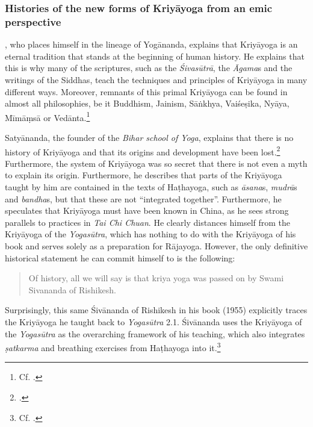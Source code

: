 \subsubsection{Histories of the new forms of Kriyāyoga from an emic perspective}

\citeauthor{kriyayoganityananda2013}, who places himself in the lineage of Yogānanda, explains that Kriyāyoga is an eternal tradition that stands at the beginning of human history. He explains that this is why many of the scriptures, such as the \textit{Śivasūtrā}, the \textit{Āgama}s and the writings of the Siddhas, teach the techniques and principles of Kriyāyoga in many different ways. Moreover, remnants of this primal Kriyāyoga can be found in almost all philosophies, be it Buddhism, Jainism, Sāṅkhya, Vaiśeṣika, Nyāya, Mīmāṃsā or Vedānta.\footnote{Cf. \citeauthor[2013: 2-7]{kriyayoganityananda2013}.}

Satyānanda, the founder of the \textit{Bihar school of Yoga}, explains that there is no history of Kriyāyoga and that its origins and development have been lost.\footnote{\citeauthor[1981: 699]{kriyayogasarasvati1981}.} Furthermore, the system of Kriyāyoga was so secret that there is not even a myth to explain its origin. Furthermore, he describes that parts of the Kriyāyoga taught by him are contained in the texts of Haṭhayoga, such as \textit{āsana}s, \textit{mudrā}s and \textit{bandha}s, but that these are not ``integrated together''. Furthermore, he speculates that Kriyāyoga must have been known in China, as he sees strong parallels to practices in \textit{Tai Chi Chuan}. He clearly distances himself from the Kriyāyoga of the \textit{Yogasūtra}, which has nothing to do with the Kriyāyoga of his book  and serves solely as a preparation for Rājayoga. However, the only definitive historical statement he can commit himself to is the following: \begin{quote} Of history, all we will say is that kriya yoga was passed on by Swami Sivananda of Rishikesh. \end{quote} Surprisingly, this same Śivānanda of Rishikesh in his book  (1955) explicitly traces the Kriyāyoga he taught back to \textit{Yogasūtra} 2.1. Śivānanda uses the Kriyāyoga of the \textit{Yogasūtra} as the overarching framework of his teaching, which also integrates \textit{ṣatkarma} and breathing exercises from Haṭhayoga into it.\footnote{Cf. \citeauthor[1982: 168-182]{shivanandakriya1982}.}

